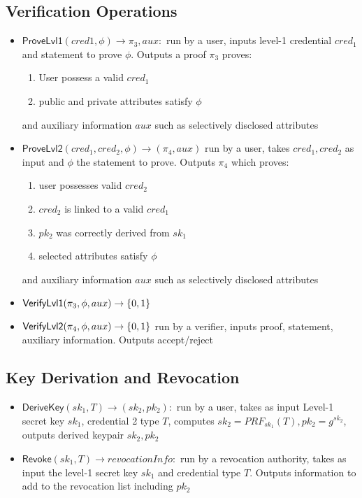 \subsection{Verification Operations}
\begin{itemize}
     \item $\mathsf{ProveLvl1}(cred1, \phi) \to \pi_3, aux:$ run by a user, inputs level-1 credential $cred_1$ and statement to prove $\phi$. Outputs a proof $\pi_3$ proves:
     \begin{enumerate}
         \item User possess a valid $cred_1$
         \item public and private attributes satisfy $\phi$
     \end{enumerate}
     and auxiliary information $aux$ such as selectively disclosed attributes
     
     \item $\mathsf{ProveLvl2}(cred_1, cred_2, \phi) \to (\pi_4, aux)$ run by a user, takes $cred_1, cred_2$ as input and $\phi$ the statement to prove. Outputs $\pi_4$ which proves:
     \begin{enumerate}
         \item user possesses valid $cred_2$
         \item $cred_2$ is linked to a valid $cred_1$
         \item $pk_2$ was correctly derived from $sk_1$
         \item selected attributes satisfy $\phi$
     \end{enumerate}
     and auxiliary information $aux$ such as selectively disclosed attributes

     \item $\mathsf{VerifyLvl1}(\pi_3, \phi, aux) \to \{0,1\}$
     \item $\mathsf{VerifyLvl2}(\pi_4, \phi, aux) \to \{0,1\}$
     run by a verifier, inputs proof, statement, auxiliary information. Outputs accept/reject
\end{itemize}


\subsection{Key Derivation and Revocation}
\begin{itemize}
    \item $\mathsf{DeriveKey}(sk_1, T) \to (sk_2, pk_2): $ run by a user, takes as input Level-1 secret key $sk_1$, credential 2 type $T$, computes $sk_2 = PRF_{sk_1}(T), pk_2 = g^{sk_2}$, outputs derived keypair $sk_2, pk_2$
    
    \item $\mathsf{Revoke}(sk_1, T) \to revocationInfo: $ run by a revocation authority, takes as input the level-1 secret key $sk_1$ and credential type $T$. Outputs information to add to the revocation list including $pk_2$
\end{itemize}

